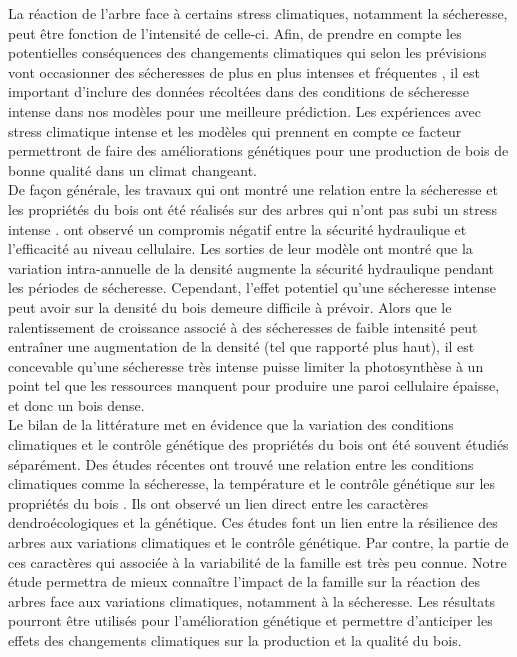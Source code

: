 \documentclass[a4paper,12pt]{report}
\begin{document}
La réaction de l'arbre face à certains stress climatiques, notamment la sécheresse, peut être fonction de l'intensité de celle-ci. Afin, de prendre en compte les potentielles conséquences des changements climatiques qui selon les prévisions vont occasionner des sécheresses de plus en plus intenses et fréquentes \citep{IPCC_2015}, il est important d'inclure des données récoltées dans des conditions de sécheresse intense dans nos modèles pour une meilleure prédiction. Les expériences avec stress climatique intense et les modèles qui prennent en compte ce facteur permettront de faire des améliorations génétiques pour une production de bois de bonne qualité dans un climat changeant.\\

De façon générale, les travaux qui ont montré une relation entre la sécheresse et les propriétés du bois ont été réalisés sur des arbres qui n'ont pas subi un stress intense \citep{Xu2012,Drew2009,Campelo2013,Jyske2009,Wilkinson2015}. \cite{Wilkinson2015} ont observé un compromis négatif entre la sécurité hydraulique et l'efficacité au niveau cellulaire. Les sorties de leur modèle ont montré que la variation intra-annuelle de la densité augmente la sécurité hydraulique pendant les périodes de sécheresse. Cependant, l'effet potentiel qu'une sécheresse intense peut avoir sur la densité du bois demeure difficile à prévoir. Alors que le ralentissement de croissance associé à des sécheresses de faible intensité peut entraîner une augmentation de la densité (tel que rapporté plus haut), il est concevable qu'une sécheresse très intense puisse limiter la photosynthèse à un point tel que les ressources manquent pour produire une paroi cellulaire épaisse, et donc un bois dense.\\ 

Le bilan de la littérature met en évidence que la variation des conditions climatiques et le contrôle génétique des propriétés du bois ont été souvent étudiés séparément. Des études récentes ont trouvé une relation entre les conditions climatiques comme la sécheresse, la température et le contrôle génétique sur les propriétés du bois \citep{Housset2018, Heer2018}. Ils ont observé un lien direct entre les caractères dendroécologiques et la génétique. Ces études font un lien entre la résilience des arbres aux variations climatiques et le contrôle génétique. Par contre, la partie de ces caractères qui associée à la variabilité de la famille est très peu connue. Notre étude permettra de mieux connaître l'impact de la famille sur la réaction des arbres face aux variations climatiques, notamment à la sécheresse. Les résultats pourront être utilisés pour l'amélioration génétique et permettre d'anticiper les effets des changements climatiques sur la production et la qualité du bois. \\
\end{document}
